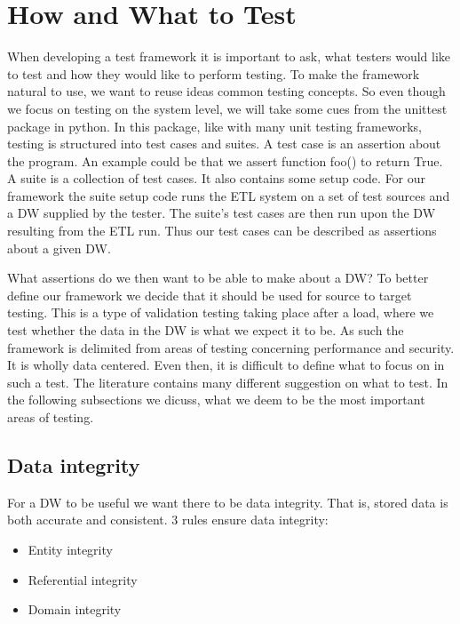 \section{How and What to Test}\label{sect:hwtest}
When developing a test framework it is important to ask, what testers would like to test and how they would like to perform testing. To make the framework natural to use, we want to reuse ideas common testing concepts. So even though we focus on testing on the system level, we will take some cues from the unittest package in python. In this package, like with many unit testing frameworks, testing is structured into test cases and suites. A test case is an assertion about the program. An example could be that we assert function foo() to return True.  A suite is a collection of test cases. It also contains some setup code.  For our framework the suite setup code runs the ETL system on a set of test sources and a DW supplied by the tester. The suite’s test cases are then run upon the DW resulting from the ETL run. Thus our test cases can be described as assertions about a given DW.  

What assertions do we then want to be able to make about a DW?  To better define our framework we decide that it should be used for source to target testing. This is a type of validation testing taking place after a load, where we test whether the data in the DW is what we expect it to be. As such the framework is delimited from areas of testing concerning performance and security. It is wholly data centered. Even then, it is difficult to define what to focus on in such a test. The literature contains many different suggestion on what to test.  In the following subsections we dicuss, what we deem to be the most important areas of testing.

\subsection{Data integrity}
For a DW to be useful we want there to be data integrity. That is, stored data is both  accurate and consistent. 3 rules ensure data integrity:  

\begin{itemize}
\item Entity integrity
\item Referential integrity
\item Domain integrity
\end{itemize}

